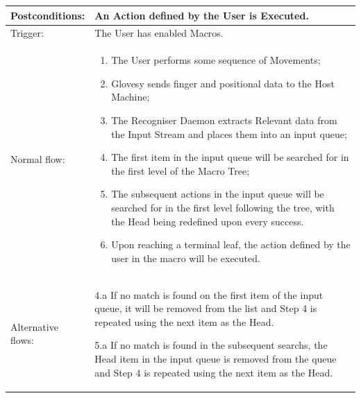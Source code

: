 \documentclass[12pt,a4paper,oneside]{book}
\theoremstyle{plain}
\numberwithin{equation}{chapter}
\begin{document}
\begin{longtable}{| p{3cm} | p{12cm} |}
\hline
Postconditions: & An Action defined by the User is Executed.\\
\hline
Trigger: & The User has enabled Macros.\\
\hline
Normal flow: &\mbox{}\par\vspace{-\baselineskip}
\begin{enumerate}
\item The User performs some sequence of Movements;
\item Glovesy sends finger and positional data to the Host Machine;
\item The Recogniser Daemon extracts Relevant data from the Input Stream and places them into an input queue;
\item The first item in the input queue will be searched for in the first level of the Macro Tree;
\item The subsequent actions in the input queue will be searched for in the first level following the tree,
      with the Head being redefined upon every success.
\item Upon reaching a terminal leaf, the action defined by the user in the macro will be executed.
\end{enumerate}\\
\hline

Alternative flows: &
4.a If no match is found on the first item of the input queue, it will be removed from the list and Step 4 is repeated
using the next item as the Head.\newline

5.a If no match is found in the subsequent searchs, the Head item in the input queue is removed from the queue and Step 4
is repeated using the next item as the Head.\newline


\end{longtable}
\end{document}
